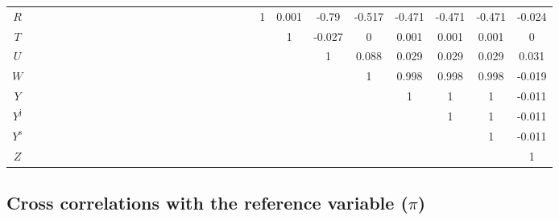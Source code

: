 \begin{tabular}{c|cccccccccccccccccccccccccccc|}
$R$ &  &  &  &  &  &  &  &  &  &  &  &  &  &  &  &  &  &  &  &  & 1 & 0.001 & -0.79 & -0.517 & -0.471 & -0.471 & -0.471 & -0.024 \\
$T$ &  &  &  &  &  &  &  &  &  &  &  &  &  &  &  &  &  &  &  &  &  & 1 & -0.027 & 0 & 0.001 & 0.001 & 0.001 & 0 \\
$U$ &  &  &  &  &  &  &  &  &  &  &  &  &  &  &  &  &  &  &  &  &  &  & 1 & 0.088 & 0.029 & 0.029 & 0.029 & 0.031 \\
$W$ &  &  &  &  &  &  &  &  &  &  &  &  &  &  &  &  &  &  &  &  &  &  &  & 1 & 0.998 & 0.998 & 0.998 & -0.019 \\
$Y$ &  &  &  &  &  &  &  &  &  &  &  &  &  &  &  &  &  &  &  &  &  &  &  &  & 1 & 1 & 1 & -0.011 \\
$Y^{\mathrm{j}}$ &  &  &  &  &  &  &  &  &  &  &  &  &  &  &  &  &  &  &  &  &  &  &  &  &  & 1 & 1 & -0.011 \\
$Y^{\mathrm{s}}$ &  &  &  &  &  &  &  &  &  &  &  &  &  &  &  &  &  &  &  &  &  &  &  &  &  &  & 1 & -0.011 \\
$Z$ &  &  &  &  &  &  &  &  &  &  &  &  &  &  &  &  &  &  &  &  &  &  &  &  &  &  &  & 1 \\
\hline
\end{tabular}


\subsection{Cross correlations with the reference variable ($\pi$)}

